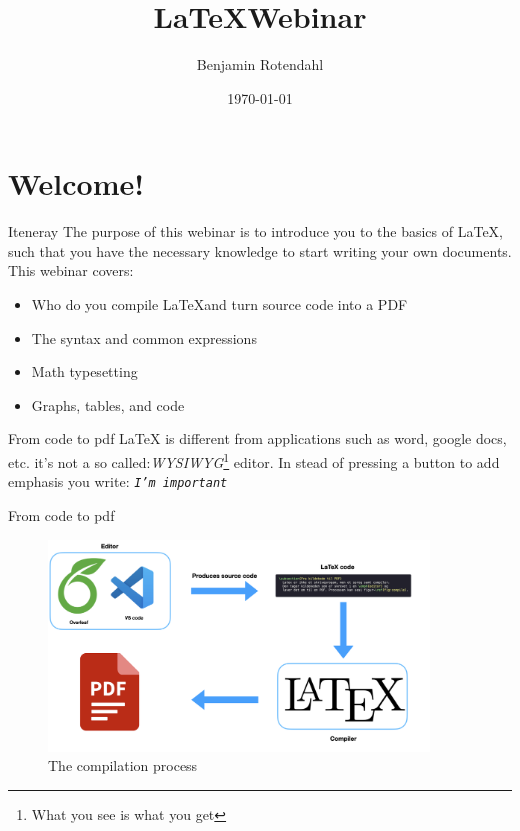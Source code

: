 \documentclass{beamer}
\title{\LaTeX Webinar}
\date{\today}
\author{Benjamin Rotendahl}
\institute{Study Now}
\newcommand{\tex}[1] {
  \texttt{#1}
}
\begin{document}
\maketitle
\section{Welcome! }
 \begin{frame}{Iteneray }
   The purpose of this webinar is to introduce you to the basics of LaTeX, such
   that you have the necessary knowledge to start writing your own documents.
   This webinar covers:
   \begin{itemize}
     \item Who do you compile \LaTeX and turn source code into a PDF \pause
     \item The syntax and common expressions \pause
     \item Math typesetting \pause
     \item Graphs, tables, and code
   \end{itemize}
 \end{frame}

 \begin{frame}{From code to pdf}
   \LaTeX{} is different from applications such as word, google docs, etc. it's
   not a so called:\emph{WYSIWYG}\footnote{What you see is what you get} editor.
   \pause
   In stead of pressing a button to add emphasis you write:
   \centering\tex{\emph{I'm important}}
 \end{frame}

 \begin{frame}{From code to pdf}
   \begin{figure}[h]
     \centering\includegraphics[width=0.9\textwidth]{../assets/compile_en.png}
     \caption{The compilation process}\label{fig:compile}
   \end{figure}
 \end{frame}
\end{document}
